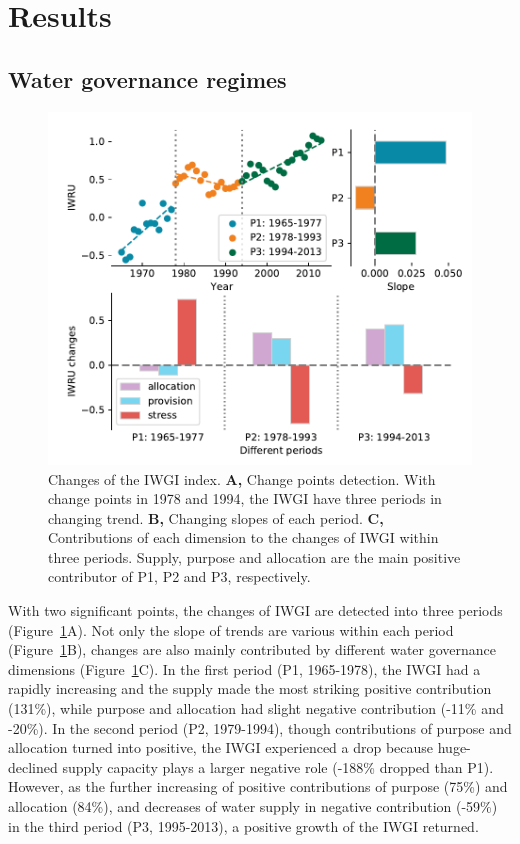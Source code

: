 \documentclass[9pt, twocolumn, twoside, lineno]{pnas-new}
\begin{document}
\section*{Results}
\subsection*{Water governance regimes}

\begin{figure}[ht!]
	\centering
	\includegraphics[width=\linewidth]{../../figures/main/index.pdf}
	\caption{Changes of the IWGI index. 
	\textbf{A,} Change points detection. With change points in 1978 and 1994, the IWGI have three periods in changing trend.
	\textbf{B,} Changing slopes of each period.
	\textbf{C,} Contributions of each dimension to the changes of IWGI within three periods. Supply, purpose and allocation are the main positive contributor of P1, P2 and P3, respectively.
	}
	\label{fig:IWGI}
\end{figure}

With two significant points, the changes of IWGI are detected into three periods (Figure~\ref{fig:IWGI}A). 
Not only the slope of trends are various within each period (Figure~\ref{fig:IWGI}B), changes are also mainly contributed by different water governance dimensions (Figure~\ref{fig:IWGI}C).
In the first period (P1, 1965-1978), the IWGI had a rapidly increasing and the supply made the most striking positive contribution (131\%), while purpose and allocation had slight negative contribution (-11\% and -20\%).
In the second period (P2, 1979-1994), though contributions of purpose and allocation turned into positive, the IWGI experienced a drop because huge-declined supply capacity plays a larger negative role (-188\% dropped than P1). 
However, as the further increasing of positive contributions of purpose (75\%) and allocation (84\%), and decreases of water supply in negative contribution (-59\%) in the third period (P3, 1995-2013), a positive growth of the IWGI returned.
\end{document}
